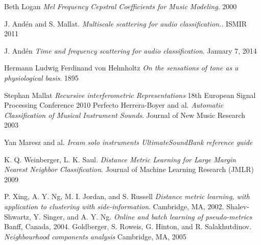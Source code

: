 \documentclass[hidelinks,12pt]{report}
\begin{document}
\begin{thebibliography}{2}
Beth Logan
\textit{Mel Frequency Cepstral Coefficients for Music Modeling}. 
2000

J. Andén and S. Mallat. 
\textit{Multiscale scattering for audio classification.}. 
ISMIR 2011

J. Andén 
\textit{Time and frequency scattering for audio classification}. 
January 7, 2014

Hermann Ludwig Ferdinand von Helmholtz
\textit{On the sensations of tone as a physiological basis}.
1895

Stephan Mallat 
\textit{Recursive interferometric Representations}  18th European Signal Processing Conference 2010
Perfecto Herrera-Boyer and al.
\textit{Automatic Classification of Musical Instrument Sounds}.
Journal of New Music Research 2003


Yan Maresz and al.
\textit{Ircam solo instruments UltimateSoundBank reference guide}

K. Q. Weinberger, L. K. Saul. 
\textit{Distance Metric Learning for Large Margin Nearest Neighbor Classification}.
Journal of Machine Learning Research (JMLR) 2009

P. Xing, A. Y. Ng, M. I. Jordan, and S. Russell 
\textit{Distance metric learning, with application to
clustering with side-information}.
 Cambridge, MA, 2002.
 Shalev-Shwartz, Y. Singer, and A. Y. Ng.
 \textit{Online and batch learning of pseudo-metrics}
 Banff, Canada, 2004.
 Goldberger, S. Roweis, G. Hinton, and R. Salakhutdinov.
 \textit{Neighbourhood components analysis}
 Cambridge, MA, 2005
\end{thebibliography}
\end{document}
